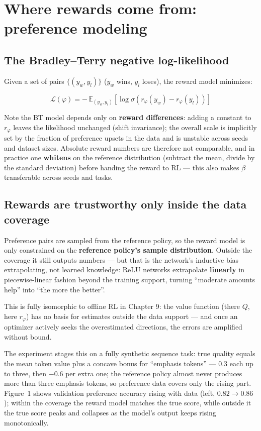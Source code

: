 \documentclass{article}
\begin{document}
\section*{Where rewards come from: preference modeling}

\subsection*{The Bradley--Terry negative log-likelihood}

Given a set of pairs $\{(y_w, y_l)\}$ ($y_w$ wins, $y_l$ loses), the reward model minimizes:

\[
\boxed{\mathcal{L}(\varphi) = -\,\mathbb{E}_{(y_w, y_l)}\left[\log \sigma\!\left(r_{\varphi}(y_w) - r_{\varphi}(y_l)\right)\right]}
\]

Note the BT model depends only on \textbf{reward differences}: adding a constant to $r_{\varphi}$ leaves the likelihood unchanged (shift invariance); the overall scale is implicitly set by the fraction of preference upsets in the data and is unstable across seeds and dataset sizes. Absolute reward numbers are therefore not comparable, and in practice one \textbf{whitens} on the reference distribution (subtract the mean, divide by the standard deviation) before handing the reward to RL --- this also makes $\beta$ transferable across seeds and tasks.

\subsection*{Rewards are trustworthy only inside the data coverage}

Preference pairs are sampled from the reference policy, so the reward model is only constrained on the \textbf{reference policy's sample distribution}. Outside the coverage it still outputs numbers --- but that is the network's inductive bias extrapolating, not learned knowledge: ReLU networks extrapolate \textbf{linearly} in piecewise-linear fashion beyond the training support, turning ``moderate amounts help'' into ``the more the better''.

This is fully isomorphic to offline RL in Chapter 9: the value function (there $Q$, here $r_{\varphi}$) has no basis for estimates outside the data support --- and once an optimizer actively seeks the overestimated directions, the errors are amplified without bound.

The experiment stages this on a fully synthetic sequence task: true quality equals the mean token value plus a concave bonus for ``emphasis tokens'' --- $0.3$ each up to three, then $-0.6$ per extra one; the reference policy almost never produces more than three emphasis tokens, so preference data covers only the rising part. Figure~1 shows validation preference accuracy rising with data (left, $0.82 \to 0.86$); within the coverage the reward model matches the true score, while outside it the true score peaks and collapses as the model's output keeps rising monotonically.
\end{document}
